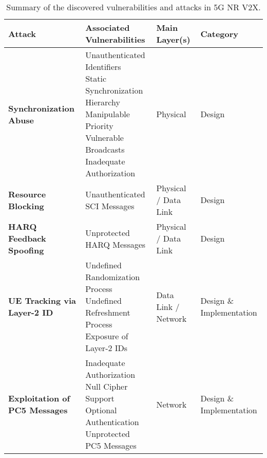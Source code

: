 \begin{table*}[!t]
\centering
\captionsetup{justification=centering, font=small, labelfont=bf}
\caption{Summary of the discovered vulnerabilities and attacks in 5G NR V2X.} 
\label{tab:mapping}
\renewcommand{\arraystretch}{1.0}
\small
\begin{tabularx}{\textwidth}{ 
  >{\centering\arraybackslash}m{3cm}  %
  >{\centering\arraybackslash}m{5cm}  %
  >{\centering\arraybackslash}m{3cm}  %
  >{\centering\arraybackslash}m{3cm}  %
}
\toprule
\textbf{Attack} & \textbf{Associated Vulnerabilities} & \textbf{Main Layer(s)} & \textbf{Category} \\ 
\midrule

\textbf{Synchronization Abuse} & 
\makecell{Unauthenticated Identifiers \\ 
Static Synchronization Hierarchy \\ 
Manipulable Priority \\
Vulnerable Broadcasts \\
Inadequate Authorization} & 
Physical & 
Design \\
\midrule

\textbf{Resource Blocking} & 
Unauthenticated SCI Messages & 
Physical / Data Link & 
Design \\
\midrule

\textbf{HARQ Feedback Spoofing} & 
Unprotected HARQ Messages & 
Physical / Data Link & 
Design \\
\midrule

\textbf{UE Tracking via Layer-2 ID} & 
\makecell{Undefined Randomization Process\\ 
Undefined Refreshment Process \\
Exposure of Layer-2 IDs} & 
Data Link / Network & 
Design \& Implementation \\
\midrule

\textbf{Exploitation of PC5 Messages} & 
\makecell{Inadequate Authorization \\ 
Null Cipher Support \\
Optional Authentication \\ 
Unprotected PC5 Messages} & 
Network & 
Design \& Implementation \\

\bottomrule
\end{tabularx}
\end{table*}

